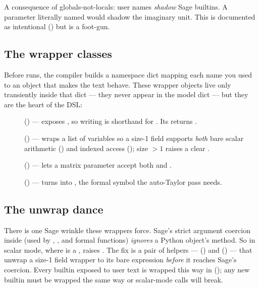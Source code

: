 \begin{gotcha}
A consequence of globals-not-locals: user names \emph{shadow} Sage builtins. A
parameter literally named  would shadow the imaginary unit. This is
documented as intentional () but is a
foot-gun.
\end{gotcha}

\subsection{The wrapper classes}

Before  runs, the compiler builds a namespace dict mapping each
name you used to an object that makes the text behave. These wrapper objects live
only transiently inside that dict --- they never appear in the model dict --- but
they are the heart of the DSL:

\begin{description}
  \item[] () ---
        exposes , so writing  is
        shorthand for . Its
         returns .
  \item[] () --- wraps a
        list of  variables so a size-1 field supports \emph{both} bare
        scalar arithmetic () and indexed access
        (); size $>1$ raises a clear .
  \item[] () --- lets a
        matrix parameter accept both  and .
  \item[] ()
        --- turns  into ,
        the formal symbol the auto-Taylor pass needs.
\end{description}

\subsection{The unwrap dance}

There is one Sage wrinkle these wrappers force. Sage's strict argument coercion
inside  (used by , , and
formal functions) \emph{ignores} a Python object's  method. So
 in scalar mode, where  is a , raises
. The fix is a pair of
helpers ---  ()
and  () --- that
unwrap a size-1 field wrapper to its bare  expression \emph{before} it
reaches Sage's coercion. Every builtin exposed to user text is wrapped this way in
 (); any new
builtin must be wrapped the same way or scalar-mode calls will break.

